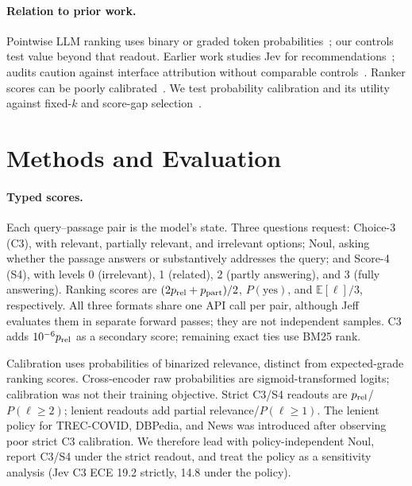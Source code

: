 \documentclass[sigconf,nonacm]{acmart}
\begin{document}
\paragraph{Relation to prior work.}
Pointwise LLM ranking uses binary or graded token probabilities~\cite{zhuang2023beyond}; our controls test value beyond that readout. Earlier work studies Jev for recommendations~\cite{lyu2026jevrec}; audits caution against interface attribution without comparable controls~\cite{tang2026tdmaudit}. Ranker scores can be poorly calibrated~\cite{penha2021calibration}. We test probability calibration and its utility against fixed-$k$ and score-gap selection~\cite{adaptivek2025}.

\section{Methods and Evaluation}
\paragraph{Typed scores.}
Each query--passage pair is the model's state. Three questions request: Choice-3 (C3), with relevant, partially relevant, and irrelevant options; Noul, asking whether the passage answers or substantively addresses the query; and Score-4 (S4), with levels 0 (irrelevant), 1 (related), 2 (partly answering), and 3 (fully answering). Ranking scores are $(2p_{\rm rel}+p_{\rm part})/2$, $P(\mathrm{yes})$, and $\mathbb{E}[\ell]/3$, respectively. All three formats share one API call per pair, although Jeff evaluates them in separate forward passes; they are not independent samples. C3 adds $10^{-6}p_{\rm rel}$ as a secondary score; remaining exact ties use BM25 rank.

Calibration uses probabilities of binarized relevance, distinct from expected-grade ranking scores. Cross-encoder raw probabilities are sigmoid-transformed logits; calibration was not their training objective. Strict C3/S4 readouts are $p_{\rm rel}$/$P(\ell\ge2)$; lenient readouts add partial relevance/$P(\ell\ge1)$. The lenient policy for TREC-COVID, DBPedia, and News was introduced after observing poor strict C3 calibration. We therefore lead with policy-independent Noul, report C3/S4 under the strict readout, and treat the policy as a sensitivity analysis (Jev C3 ECE 19.2 strictly, 14.8 under the policy).
\end{document}
